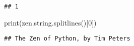 \documentclass[]{article}
\newenvironment{Shaded}{\begin{snugshade}}{\end{snugshade}}
\newcommand{\DecValTok}[1]{\textcolor[rgb]{0.00,0.00,0.81}{#1}}
\newcommand{\BuiltInTok}[1]{#1}
\newcommand{\NormalTok}[1]{#1}
\begin{document}
\begin{verbatim}
## 1
\end{verbatim}

\begin{Shaded}
\begin{Highlighting}[]
\BuiltInTok{print}\NormalTok{(zen.string.splitlines()[}\DecValTok{0}\NormalTok{])}
\end{Highlighting}
\end{Shaded}

\begin{verbatim}
## The Zen of Python, by Tim Peters
\end{verbatim}
\end{document}
